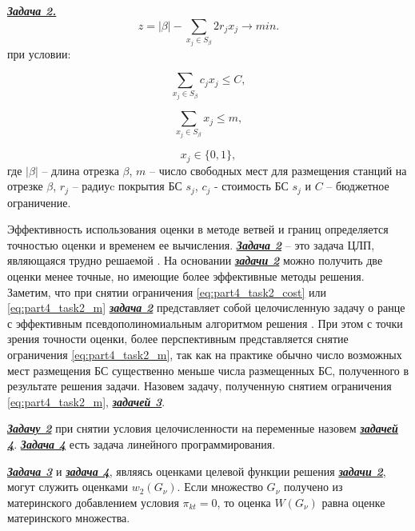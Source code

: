 \underline{\textit{\textbf{Задача 2.}}}
\begin{displaymath}
    z = |\beta| - \sum\limits_{x_j \in S_\beta} 2r_j x_j \rightarrow min.
\end{displaymath}
при условии:

\begin{equation}\label{eq:part4_task2_cost}
    \sum\limits_{x_j \in S_\beta} c_j x_j \leqslant C,
\end{equation}

\begin{equation}\label{eq:part4_task2_m}
    \sum\limits_{x_j \in S_\beta} x_j \leqslant m,
\end{equation}

\begin{displaymath}
    x_j \in \{0, 1\},
\end{displaymath}
где $|\beta|$ -- длина отрезка $\beta$, $m$ -- число свободных мест для размещения станций на отрезке $\beta$, $r_j$ -- радиуc покрытия БС $s_j$, $c_j$ - стоимость БС $s_j$ и $C$ -- бюджетное ограничение.

Эффективность использования оценки в методе ветвей и границ определяется точностью оценки и временем ее вычисления. \underline{\textit{\textbf{Задача 2}}} -- это задача ЦЛП, являющаяся трудно решаемой \cite{Gari}. На основании \underline{\textit{\textbf{задачи 2}}} можно получить две оценки менее точные, но имеющие более эффективные методы решения. Заметим, что при снятии ограничения \cref{eq:part4_task2_cost} или \cref{eq:part4_task2_m} \underline{\textit{\textbf{задача 2}}} представляет собой целочисленную задачу о ранце с эффективным псевдополиномиальным алгоритмом решения \cite{Gari}. При этом с точки зрения точности оценки, более перспективным представляется снятие ограничения \cref{eq:part4_task2_m}, так как на практике обычно число возможных мест размещения БС существенно меньше числа размещенных БС, полученного в результате решения задачи. Назовем задачу, полученную снятием ограничения \cref{eq:part4_task2_m}, \underline{\textit{\textbf{задачей 3}}}.

\underline{\textit{\textbf{Задачу 2}}} при снятии условия целочисленности на переменные назовем \underline{\textit{\textbf{задачей 4}}}. \underline{\textit{\textbf{Задача 4}}} есть задача линейного программирования. 

\underline{\textit{\textbf{Задача 3}}} и \underline{\textit{\textbf{задача 4}}}, являясь оценками целевой функции решения \underline{\textit{\textbf{задачи 2}}}, могут служить оценками $w_2 (G_\nu)$. Если множество $G_\nu$ получено из материнского добавлением условия $\pi_{kt}=0$, то оценка $W(G_\nu)$ равна оценке материнского множества.

